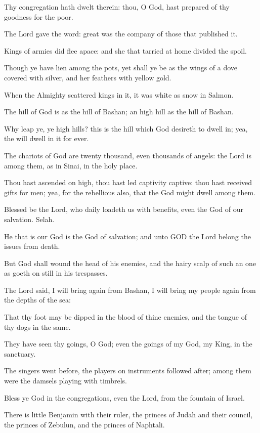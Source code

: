 \verse Thy congregation hath dwelt therein: thou, O God, hast prepared of thy goodness for the poor.

\verse The Lord gave the word: great was the company of those that published it.

\verse Kings of armies did flee apace: and she that tarried at home divided the spoil.

\verse Though ye have lien among the pots, yet shall ye be as the wings of a dove covered with silver, and her feathers with yellow gold.

\verse When the Almighty scattered kings in it, it was white as snow in Salmon.

\verse The hill of God is as the hill of Bashan; an high hill as the hill of Bashan.

\verse Why leap ye, ye high hills? this is the hill which God desireth to dwell in; yea, the \LORD will dwell in it for ever.

\verse The chariots of God are twenty thousand, even thousands of angels: the Lord is among them, as in Sinai, in the holy place.

\verse Thou hast ascended on high, thou hast led captivity captive: thou hast received gifts for men; yea, for the rebellious also, that the \LORD God might dwell among them.

\verse Blessed be the Lord, who daily loadeth us with benefits, even the God of our salvation. Selah.

\verse He that is our God is the God of salvation; and unto GOD the Lord belong the issues from death.

\verse But God shall wound the head of his enemies, and the hairy scalp of such an one as goeth on still in his trespasses.

\verse The Lord said, I will bring again from Bashan, I will bring my people again from the depths of the sea:

\verse That thy foot may be dipped in the blood of thine enemies, and the tongue of thy dogs in the same.

\verse They have seen thy goings, O God; even the goings of my God, my King, in the sanctuary.

\verse The singers went before, the players on instruments followed after; among them were the damsels playing with timbrels.

\verse Bless ye God in the congregations, even the Lord, from the fountain of Israel.

\verse There is little Benjamin with their ruler, the princes of Judah and their council, the princes of Zebulun, and the princes of Naphtali.

